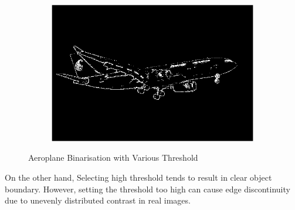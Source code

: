 \documentclass[12pt,a4paper]{report}
\begin{document}
\begin{figure}[!htb]
\begin{subfigure}{0.49\linewidth}
  \end{subfigure}
  \begin{subfigure}{0.49\linewidth}
    \includegraphics[width=1\linewidth]{output/aeroplane_Q4_t_128.png}
  \end{subfigure}
  \caption{Aeroplane Binarisation with Various Threshold}
\end{figure}
On the other hand, Selecting high threshold tends to result in clear object boundary. However, setting the threshold too high can cause edge discontinuity due to unevenly distributed contrast in real images.
\end{document}
